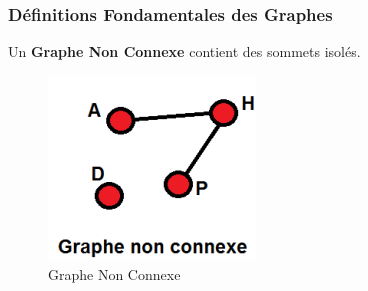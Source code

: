 \begin{frame}
\frametitle{Définitions Fondamentales des Graphes}

\begin{tcolorbox}[colback=orange!10,colframe=orange!100!black,
    title=Un Graphe Non Connexe]
    Un \textbf{Graphe Non Connexe} contient des sommets isolés.
\end{tcolorbox}

\begin{figure}[H]
    \centering
    \includegraphics[width=0.5 \textwidth]{Figures/Graphe Non Connexe.PNG}
    \caption{Graphe Non Connexe}
    \label{fig:Graphe Non Connexe}
\end{figure}

\end{frame}


